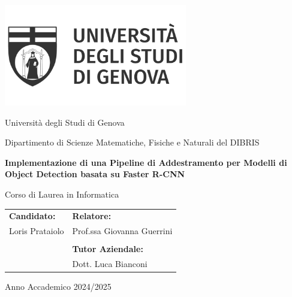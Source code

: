 \begin{titlepage}
    \centering

    \vspace*{2cm} 
    \includegraphics[width=0.6\textwidth]{images/universita-degli-studi-di-genova-logo-vector.png} %
    \vspace{1cm}

    {\normalsize Università degli Studi di Genova\par}
    {\normalsize Dipartimento di Scienze Matematiche, Fisiche e Naturali del DIBRIS\par}
    \vspace{1cm}

    {\Large \textbf{Implementazione di una Pipeline di Addestramento per Modelli di Object Detection basata su Faster R-CNN}\par}
    \vspace{1cm}

    {\normalsize Corso di Laurea in Informatica\par}
    \vspace{2cm}

    \begin{tabular}{ll}
        \textbf{Candidato:} & \hspace{5cm}\textbf{Relatore:} \\
        Loris Prataiolo & \hspace{5cm}Prof.ssa Giovanna Guerrini \\
        & \\
        & \hspace{5cm}\textbf{Tutor Aziendale:} \\
        & \hspace{5cm}Dott. Luca Bianconi \\
    \end{tabular}
    \vspace{3cm}

    {\normalsize Anno Accademico 2024/2025\par}

    \vspace*{\fill} 
\end{titlepage}